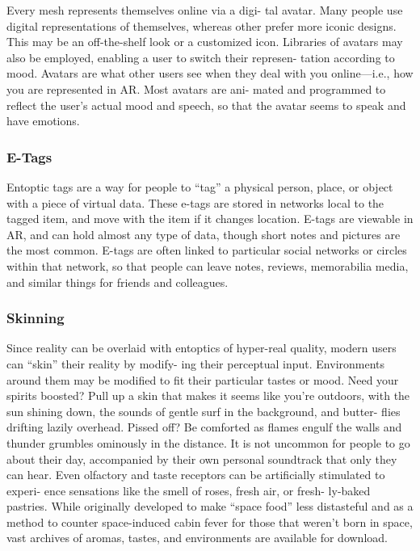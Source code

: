 Every mesh represents themselves online via a digi-
tal avatar. Many people use digital representations 
of themselves, whereas other prefer more iconic 
designs. This may be an off-the-shelf look or a 
customized icon. Libraries of avatars may also be 
employed, enabling a user to switch their represen-
tation according to mood. Avatars are what other 
users see when they deal with you online—i.e., how 
you are represented in AR. Most avatars are ani-
mated and programmed to reflect the user's actual 
mood and speech, so that the avatar seems to speak 
and have emotions.

\subsubsection{E-Tags}

Entoptic tags are a way for people to ``tag'' a physical 
person, place, or object with a piece of virtual data. 
These e-tags are stored in networks local to the tagged 
item, and move with the item if it changes location. 
E-tags are viewable in AR, and can hold almost any 
type of data, though short notes and pictures are the 
most common. E-tags are often linked to particular 
social networks or circles within that network, so that 
people can leave notes, reviews, memorabilia media, 
and similar things for friends and colleagues.

\subsubsection{Skinning}

Since reality can be overlaid with entoptics of hyper-real 
quality, modern users can ``skin'' their reality by modify-
ing their perceptual input. Environments around them 
may be modified to fit their particular tastes or mood. 
Need your spirits boosted? Pull up a skin that makes it 
seems like you're outdoors, with the sun shining down, 
the sounds of gentle surf in the background, and butter-
flies drifting lazily overhead. Pissed off? Be comforted as 
flames engulf the walls and thunder grumbles ominously 
in the distance. It is not uncommon for people to go 
about their day, accompanied by their own personal 
soundtrack that only they can hear. Even olfactory and 
taste receptors can be artificially stimulated to experi-
ence sensations like the smell of roses, fresh air, or fresh-
ly-baked pastries. While originally developed to make 
``space food'' less distasteful and as a method to counter 
space-induced cabin fever for those that weren't born in 
space, vast archives of aromas, tastes, and environments 
are available for download.

